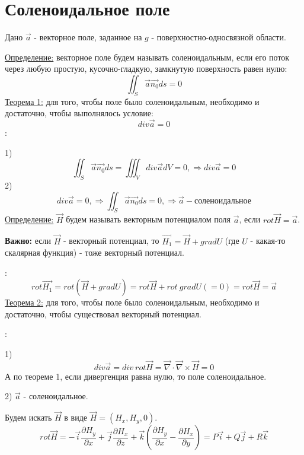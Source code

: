 \documentclass[12pt]{article}
\begin{document}
\section{Соленоидальное поле}
Дано $\overrightarrow{a}$ - векторное поле, заданное на $g$ - поверхностно-односвязной области.\par
\uline{Определение:} векторное поле будем называть соленоидальным, если его поток через любую простую, кусочно-гладкую, замкнутую поверхность равен нулю:
$$\iint_S \overrightarrow{a} \overrightarrow{n_0} ds = 0$$
\uline{Теорема 1:} для того, чтобы поле было соленоидальным, необходимо и достаточно, чтобы выполнялось условие:
$$div \overrightarrow{a} = 0$$
:\par
1) $$\iint_S \overrightarrow{a} \overrightarrow{n_0} ds = \iiint_V div \overrightarrow{a} d V = 0, \Rightarrow div \overrightarrow{a} = 0$$
2) $$div \overrightarrow{a} = 0, \Rightarrow \iint_S \overrightarrow{a} \overrightarrow{n_0} ds = 0, \Rightarrow \overrightarrow{a} - \text{соленоидальное}$$
\uline{Определение:} $\overrightarrow{H}$ будем называть векторным потенциалом поля $\overrightarrow{a}$, если $rot \overrightarrow{H} = \overrightarrow{a}$.\par
\textbf{Важно:} если $\overrightarrow{H}$ - векторный потенциал, то $\overrightarrow{H_1} = \overrightarrow{H} + gradU$ (где $U$ - какая-то скалярная функция) - тоже векторный потенциал.\par
{}:
$$rot \overrightarrow{H_1} = rot (\overrightarrow{H} + gradU) = rot \overrightarrow{H} + rot \ gradU (=0) = rot \overrightarrow{H} = \overrightarrow{a}$$
\uline{Теорема 2:} для того, чтобы поле было соленоидальным, необходимо и достаточно, чтобы существовал векторный потенциал.\par
{}:\par
1) $$div \overrightarrow{a} = div \ rot \overrightarrow{H} = \overrightarrow{\nabla} \cdot \overrightarrow{\nabla} \times \overrightarrow{H} = 0$$
А по теореме 1, если дивергенция равна нулю, то поле соленоидальное.\par
2) $\overrightarrow{a}$ - соленоидальное.\par
Будем искать $\overrightarrow{H}$ в виде $\overrightarrow{H} = (H_x, H_y, 0)$.
$$rot \overrightarrow{H} = -\overrightarrow{i} \frac{\partial H_y}{\partial x} + \overrightarrow{j} \frac{\partial H_x}{\partial z} + \overrightarrow{k} (\frac{\partial H_y}{\partial x} - \frac{\partial H_x}{\partial y}) = P\overrightarrow{i} + Q\overrightarrow{j}+R\overrightarrow{k}$$
\end{document}
